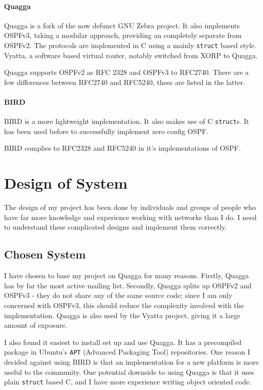 \documentclass[12pt]{report}
\begin{document}
\subsubsection{Quagga}
Quagga\cite{QuaggaHome} is a fork of the now defunct GNU Zebra project. It also implements
OSPFv3, taking a modular approach, providing an completely separate from OSPFv2.
The protocols are implemented in C using a mainly \texttt{struct} based style.
Vyatta, a software based virtual router, notably switched from XORP to Quagga. 

Quagga supports OSPFv2 as RFC 2328 and OSPFv3 to RFC2740. There are a few
differences between RFC2740 and RFC5240, these are listed in the latter.

\subsubsection{BIRD}
BIRD\cite{BirdHome} is a more lightweight implementation. It also makes use of C
\texttt{struct}s. It has been used before to successfully implement zero config
OSPF. 

BIRD complies to RFC2328 and RFC5240 in it's implementations of OSPF. 

\chapter{Design of System}
The design of my project has been done by individuals and groups of
people who have far more knowledge and experience working with networks than I
do. I need to understand these complicated designs and implement them
correctly.

\section{Chosen System}
I have chosen to base my project on Quagga for many reasons. Firstly, Quagga has
by far the most active mailing list. Secondly, Quagga splits up OSPFv2 and
OSPFv3 - they do not share any of the same source code; since I am only
concerned with OSPFv3, this should reduce the complexity involved with the
implementation. Quagga is also used by the Vyatta project, giving it a large
amount of exposure. 

I also found it easiest to install set up and use Quagga. It has a precompiled
package in Ubuntu's \texttt{APT} (Advanced Packaging Tool)
 repositories. One reason I decided
against using BIRD is that an implementation for a new platform is more useful
to the community. One potential downside to using Quagga is that it uses plain
\texttt{struct} based C, and I have more experience writing object oriented
code. 
\end{document}
